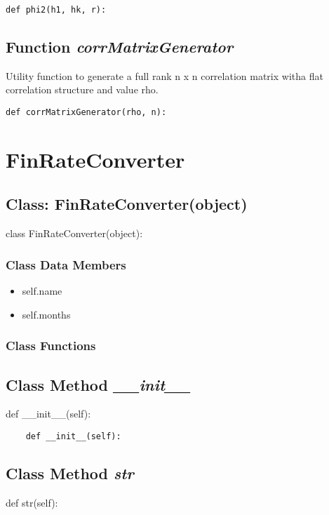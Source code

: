 \documentclass[twoside,11pt]{book}
\begin{document}
\begin{lstlisting}
def phi2(h1, hk, r):
\end{lstlisting}

\subsection{Function {\it corrMatrixGenerator}}
Utility function to generate a full rank n x n correlation matrix witha flat correlation structure and value rho. 

\begin{lstlisting}
def corrMatrixGenerator(rho, n):
\end{lstlisting}

\newpage
\section{FinRateConverter}

\subsection{Class: FinRateConverter(object)}
class FinRateConverter(object):

\subsubsection{Class Data Members}
\begin{itemize}
\item{self.name}
\item{self.months}
\end{itemize}

\subsubsection{Class Functions}

\subsection{Class Method {\it \_\_init\_\_}}
def \_\_init\_\_(self):

\begin{lstlisting}
    def __init__(self):
\end{lstlisting}

\subsection{Class Method {\it str}}
def str(self):
\end{document}
